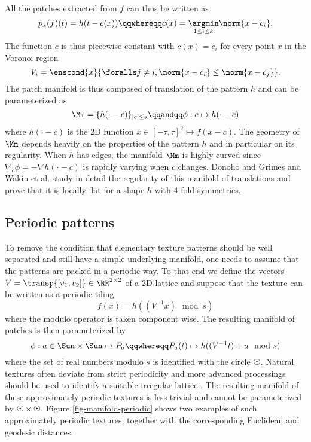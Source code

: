 All the patches extracted from $f$ can thus be written as
\begin{equation*}
	p_x(f)(t) = h(t-c(x))
	\qqwhereqq c(x) = \underset{1 \leq i \leq k}{\argmin} \norm{x-c_i}.
\end{equation*}
The function $c$ is thus piecewise constant with $c(x)=c_i$ for every point $x$ in the Voronoi region 
\begin{equation*}
	V_i = \enscond{x}{\foralls j \neq i, \norm{x-c_i} \leq \norm{x-c_j}}.
\end{equation*} 
The patch manifold is thus composed of translation of the pattern $h$ and can be parameterized as
\begin{equation*}
	\Mm = \{h(\cdot-c)\}_{|c| \leq s}
	\qqandqq 
	\phi : c \mapsto h(\cdot-c)
\end{equation*}	
where $h(\cdot-c)$ is the 2D function $x \in [-\tau,\tau]^2 \mapsto f(x-c)$. The geometry of $\Mm$ depends heavily on the properties of the pattern $h$ and in particular on its regularity. When $h$ has edges, the manifold $\Mm$ is highly curved since $\nabla_c \phi = -\nabla h(\cdot - c)$ is rapidly varying when $c$ changes. Donoho and Grimes \cite{donoho-isomap} and Wakin et al. \cite{wakin-multiscale-structure} study in detail the regularity of this manifold of translations and prove that it is locally flat for a shape $h$ with 4-fold symmetries.

\subsection{Periodic patterns}

To remove the condition that elementary texture patterns should be well separated and still have a simple underlying manifold, one needs to assume that the patterns are packed in a periodic way. To that end we define the vectors $V = \transp{[v_1, v_2]} \in \RR^{2\times 2}$ of a 2D lattice and suppose that the texture can be written as a periodic tiling 
\begin{equation*}
	f(x) = h( (V^{-1} x) \mod s )
\end{equation*}
where the modulo operator is taken component wise. The resulting manifold of patches is then parameterized by
\begin{equation*}
	\phi : a \in \Sun \times \Sun \mapsto P_a
	\qqwhereqq
	P_a(t) \mapsto h( (V^{-1} t) + a \mod s )
\end{equation*}
where the set of real numbers modulo $s$ is identified with the circle $\Sun$.
Natural textures often deviate from strict periodicity and more advanced processings should be used to identify a suitable irregular lattice \cite{liu-periodicity-directionality,liu-promise}. The resulting manifold of these approximately periodic textures is less trivial and cannot be parameterized by $\Sun \times \Sun$. Figure \ref{fig-manifold-periodic} shows two examples of such approximately periodic textures, together with the corresponding Euclidean and geodesic distances.

